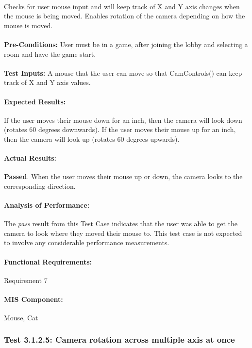 \documentclass{article}
\begin{document}
    \paragraph{} Checks for user mouse input and will keep track of X and Y axis changes when the mouse is being moved. Enables rotation of the camera depending on how the mouse is moved.
    \paragraph{}\textbf{Pre-Conditions:} User must be in a game, after joining the lobby and selecting a room and have the game start.
    \paragraph{}\textbf{Test Inputs:} A mouse that the user can move so that CamControls() can keep track of X and Y axis values.
    \paragraph{Expected Results:} If the user moves their mouse down for an inch, then the camera will look down (rotates 60 degrees downwards). If the user moves their mouse up for an inch, then the camera will look up (rotates 60 degrees upwards).
    \paragraph{Actual Results:} \textbf{Passed}. When the user moves their mouse up or down, the camera looks to the corresponding direction. 
    \paragraph{Analysis of Performance:} The \emph{pass} result from this Test Case indicates that the user was able to get the camera to look where they moved their mouse to. This test case is not expected to involve any considerable performance measurements.
    \paragraph{Functional Requirements:} Requirement 7
    \paragraph{MIS Component:} Mouse, Cat
    
    \subsubsection{Test 3.1.2.5: Camera rotation across multiple axis at once}
\end{document}

